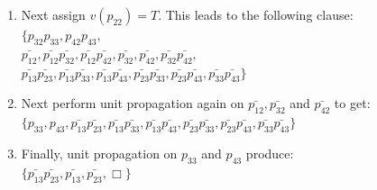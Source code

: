 \documentclass[]{exam}
\begin{document}
\begin{questions}
\begin{parts}
\begin{solution}
\begin{enumerate}
\item Next assign $v(p_{22}) = T$. This leads to the following clause:\\
$\{ 
         p_{32}p_{33}, 
         p_{42}p_{43},$ \\
$\bar{p_{12}},
 \bar{p_{12}}\bar{p_{32}},
 \bar{p_{12}}\bar{p_{42}},
             \bar{p_{32}},
             \bar{p_{42}},
 \bar{p_{32}}\bar{p_{42}},$\\
$\bar{p_{13}}\bar{p_{23}},
 \bar{p_{13}}\bar{p_{33}},
 \bar{p_{13}}\bar{p_{43}},
 \bar{p_{23}}\bar{p_{33}},
 \bar{p_{23}}\bar{p_{43}},
 \bar{p_{33}}\bar{p_{43}}\}$ \\
\item Next perform unit propagation again on $\bar{p_{12}}, \bar{p_{32}}$ and
$\bar{p_{42}}$ to get:\\
$\{ 
               p_{33}, 
               p_{43},
 \bar{p_{13}}\bar{p_{23}},
 \bar{p_{13}}\bar{p_{33}},
 \bar{p_{13}}\bar{p_{43}},
 \bar{p_{23}}\bar{p_{33}},
 \bar{p_{23}}\bar{p_{43}},
 \bar{p_{33}}\bar{p_{43}}\}$ \\
\item Finally, unit propagation on $p_{33}$ and $p_{43}$ produce:\\
$\{ 
 \bar{p_{13}}\bar{p_{23}},
 \bar{p_{13}}            ,
 \bar{p_{23}}            ,
             \Box       \}$ \\
\end{enumerate}
\end{solution}
\end{parts}

\end{questions}
\end{document}
